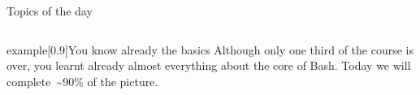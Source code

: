 
\begin{frame}
    \titlepage
\end{frame}
\begin{frame}{Topics of the day}
    \medskip
    \begin{columns}[t]
        \begin{column}{.45\textwidth}
            \hspace*{4mm}
            \begin{minipage}[t][0.4\textheight]{\textwidth}
                \tableofcontents[sections={1-3}]
            \end{minipage}
        \end{column}
        \begin{column}{.45\textwidth}
            \begin{minipage}[t][0.4\textheight]{\textwidth}
                \tableofcontents[sections={4-}]
            \end{minipage}
        \end{column}
    \end{columns}
    \vspace{8mm}
    \begin{varblock}{example}[0.9\textwidth]{You know already the basics}
        Although only one third of the course is over, you learnt already almost everything about the core of Bash.
        Today we will complete \,\textasciitilde90\% of the picture.
    \end{varblock}
\end{frame}
